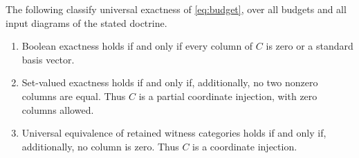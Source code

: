 \begin{theorem}\label{thm:matrix}
The following classify universal exactness of \eqref{eq:budget}, over
all budgets and all input diagrams of the stated doctrine.
\begin{enumerate}[label=(\roman*)]
\item Boolean exactness holds if and only if every column of $C$ is zero
or a standard basis vector.
\item Set-valued exactness holds if and only if, additionally, no two
nonzero columns are equal. Thus $C$ is a partial coordinate injection,
with zero columns allowed.
\item Universal equivalence of retained witness categories holds if and
only if, additionally, no column is zero. Thus $C$ is a coordinate injection.
\end{enumerate}
\end{theorem}
